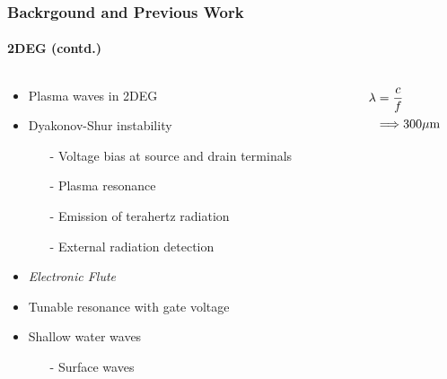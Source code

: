 \documentclass[mathserif,18pt,xcolor=table]{beamer}
\begin{document}
\begin{frame}
  \frametitle{Backrgound and Previous Work}
  \framesubtitle{2DEG (contd.)}

  \begin{columns} %
    \begin{column}{.5\textwidth}
      \begin{minipage}[T][.1\textheight][c]{\linewidth}
        \begin{itemize}
          \item Plasma waves in 2DEG
          \item Dyakonov-Shur instability
          \begin{itemize}
            \item[-]{Voltage bias at source and drain terminals}
            \item[-]{Plasma resonance}
            \item[-]{Emission of terahertz radiation}
            \item[-]{External radiation detection}
          \end{itemize}
          \item \emph{Electronic Flute}
          \item Tunable resonance with gate voltage
          \item Shallow water waves
          \begin{itemize}
            \item[-]{\color{red}Surface waves}
          \end{itemize}
        \end{itemize}
      \end{minipage}
    \end{column}
    \begin{column}{.5\textwidth}
      \begin{figure}
        \def\svgwidth{\linewidth}
        
      \end{figure}
      \begin{equation} \nonumber
        \begin{split}
          \lambda &= \frac{c}{f} \\
                & \Longrightarrow  300 \mu \mathrm{m}
        \end{split}
        \label{eq:disp_TE_two}
      \end{equation}
      \end{column}%
    \end{columns}
\end{frame}
\end{document}
